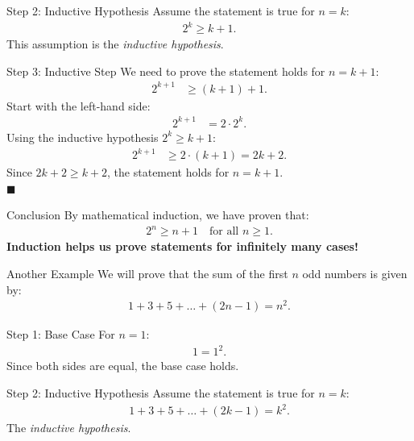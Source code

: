 \documentclass{beamer}
\renewcommand{\qed}{\\ \hfill $\blacksquare$}
\begin{document}
\begin{frame}{Step 2: Inductive Hypothesis}
    Assume the statement is true for $n = k$:
    \begin{align*}
        2^k \geq k + 1.
    \end{align*}
    This assumption is the \textit{inductive hypothesis}.
\end{frame}

\begin{frame}{Step 3: Inductive Step}
    We need to prove the statement holds for $n = k+1$:
    \begin{align*}
        2^{k+1} &\geq (k+1) + 1.
    \end{align*}
    \pause
    Start with the left-hand side:
    \begin{align*}
        2^{k+1} &= 2 \cdot 2^k.
    \end{align*}
    \pause
    Using the inductive hypothesis $2^k \geq k+1$:
    \begin{align*}
        2^{k+1} &\geq 2 \cdot (k+1) = 2k + 2.
    \end{align*}
    \pause
    Since $2k + 2 \geq k + 2$, the statement holds for $n = k+1$.
    \qed
\end{frame}

\begin{frame}{Conclusion}
    By mathematical induction, we have proven that:
    \begin{align*}
        2^n \geq n + 1 \quad \text{for all } n \geq 1.
    \end{align*}
    \textbf{Induction helps us prove statements for infinitely many cases!}
\end{frame}

\begin{frame}{Another Example}
    We will prove that the sum of the first $n$ odd numbers is given by:
    \begin{align*}
        1 + 3 + 5 + \dots + (2n - 1) = n^2.
    \end{align*}
\end{frame}

\begin{frame}{Step 1: Base Case}
    For $n = 1$:
    \begin{align*}
        1 = 1^2.
    \end{align*}
    Since both sides are equal, the base case holds. \checkmark
\end{frame}

\begin{frame}{Step 2: Inductive Hypothesis}
  Assume the statement is true for $n = k$:
  \begin{align*}
    1 + 3 + 5 + \dots + (2k - 1) = k^2.
  \end{align*}
  The \textit{inductive hypothesis}.
\end{frame}
\end{document}
